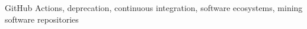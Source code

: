 \begin{abstract}
\end{abstract}

\begin{IEEEkeywords}
GitHub Actions, deprecation, continuous integration, software ecosystems, mining software repositories
\end{IEEEkeywords}
